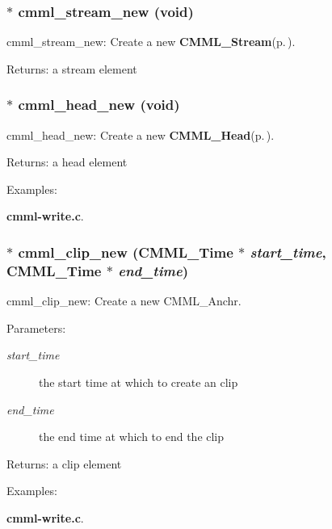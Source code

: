 \subsubsection{$\ast$ cmml\_\-stream\_\-new (void)}\label{cmml_8h_a58}


cmml\_\-stream\_\-new: Create a new {\bf CMML\_\-Stream}{\rm (p.\,\pageref{structCMML__Stream})}.

\begin{Desc}
\item[Returns:]a stream element \end{Desc}
\subsubsection{$\ast$ cmml\_\-head\_\-new (void)}\label{cmml_8h_a59}


cmml\_\-head\_\-new: Create a new {\bf CMML\_\-Head}{\rm (p.\,\pageref{structCMML__Head})}.

\begin{Desc}
\item[Returns:]a head element \end{Desc}
\begin{Desc}
\item[Examples: ]\par
{\bf cmml-write.c}.\end{Desc}
\subsubsection{$\ast$ cmml\_\-clip\_\-new ({\bf CMML\_\-Time} $\ast$ {\em start\_\-time}, {\bf CMML\_\-Time} $\ast$ {\em end\_\-time})}\label{cmml_8h_a60}


cmml\_\-clip\_\-new: Create a new CMML\_\-Anchr.

\begin{Desc}
\item[Parameters:]
\begin{description}
\item[{\em start\_\-time}]the start time at which to create an clip \item[{\em end\_\-time}]the end time at which to end the clip\end{description}
\end{Desc}
\begin{Desc}
\item[Returns:]a clip element \end{Desc}
\begin{Desc}
\item[Examples: ]\par
{\bf cmml-write.c}.\end{Desc}

